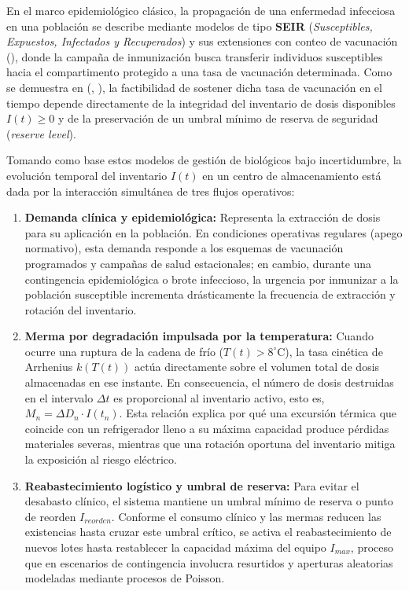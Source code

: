 \documentclass[
  spanish,
  us-letterpaper,
]{scrreprt}
\providecommand{\tightlist}{%
  \setlength{\itemsep}{0pt}\setlength{\parskip}{0pt}}
\numberwithin{equation}{section}
\theoremstyle{plain}
\theoremstyle{plain}
\theoremstyle{plain}
\theoremstyle{definition}
\theoremstyle{remark}
\begin{document}
En el marco epidemiológico clásico, la propagación de una enfermedad
infecciosa en una población se describe mediante modelos de tipo
\textbf{SEIR} (\emph{Susceptibles, Expuestos, Infectados y Recuperados})
y sus extensiones con conteo de vacunación
(), donde la campaña de inmunización busca transferir individuos
susceptibles hacia el compartimento protegido a una tasa de vacunación
determinada. Como se demuestra en
(, ), la
factibilidad de sostener dicha tasa de vacunación en el tiempo depende
directamente de la integridad del inventario de dosis disponibles
\(I(t) \ge 0\) y de la preservación de un umbral mínimo de reserva de
seguridad (\emph{reserve level}).

Tomando como base estos modelos de gestión de biológicos bajo
incertidumbre, la evolución temporal del inventario \(I(t)\) en un
centro de almacenamiento está dada por la interacción simultánea de tres
flujos operativos:

\begin{enumerate}
\def\labelenumi{\arabic{enumi}.}
\tightlist
\item
  \textbf{Demanda clínica y epidemiológica:} Representa la extracción de
  dosis para su aplicación en la población. En condiciones operativas
  regulares (apego normativo), esta demanda responde a los esquemas de
  vacunación programados y campañas de salud estacionales; en cambio,
  durante una contingencia epidemiológica o brote infeccioso, la
  urgencia por inmunizar a la población susceptible incrementa
  drásticamente la frecuencia de extracción y rotación del inventario.
\item
  \textbf{Merma por degradación impulsada por la temperatura:} Cuando
  ocurre una ruptura de la cadena de frío (\(T(t) > 8^\circ\text{C}\)),
  la tasa cinética de Arrhenius \(k(T(t))\) actúa directamente sobre el
  volumen total de dosis almacenadas en ese instante. En consecuencia,
  el número de dosis destruidas en el intervalo \(\Delta t\) es
  proporcional al inventario activo, esto es,
  \(M_n = \Delta D_n \cdot I(t_n)\). Esta relación explica por qué una
  excursión térmica que coincide con un refrigerador lleno a su máxima
  capacidad produce pérdidas materiales severas, mientras que una
  rotación oportuna del inventario mitiga la exposición al riesgo
  eléctrico.
\item
  \textbf{Reabastecimiento logístico y umbral de reserva:} Para evitar
  el desabasto clínico, el sistema mantiene un umbral mínimo de reserva
  o punto de reorden \(I_{reorden}\). Conforme el consumo clínico y las
  mermas reducen las existencias hasta cruzar este umbral crítico, se
  activa el reabastecimiento de nuevos lotes hasta restablecer la
  capacidad máxima del equipo \(I_{max}\), proceso que en escenarios de
  contingencia involucra resurtidos y aperturas aleatorias modeladas
  mediante procesos de Poisson.
\end{enumerate}
\end{document}
